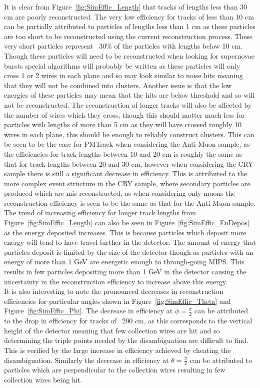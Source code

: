 It is clear from Figure~\ref{fig:SimEffic_Length} that tracks of lengths less than 30 cm are poorly reconstructed. The very low efficiency for tracks of less than 10 cm can be partially attributed to particles of lengths less than 1 cm as these particles are too short to be reconstructed using the current reconstruction process. These very short particles represent ~30\% of the particles with lengths below 10 cm. Though these particles will need to be reconstructed when looking for supernovae bursts special algorithms will probably be written as these particles will only cross 1 or 2 wires in each plane and so may look similar to noise hits meaning that they will not be combined into clusters. Another issue is that the low energies of these particles may mean that the hits are below threshold and so will not be reconstructed. The reconstruction of longer tracks will also be affected by the number of wires which they cross, though this should matter much less for particles with lengths of more than 5 cm as they will have crossed roughly 10 wires in each plane, this should be enough to reliably construct clusters. This can be seen to be the case for PMTrack when considering the Anti-Muon sample, as the efficiencies for track lengths between 10 and 20 cm is roughly the same as that for track lengths between 20 and 30 cm, however when considering the CRY sample there is still a significant decrease in efficiency. This is attributed to the more complex event structure in the CRY sample, where secondary particles are produced which are mis-reconstructed, as when considering only muons the reconstruction efficiency is seen to be the same as that for the Anti-Muon sample. \\

The trend of increasing efficiency for longer track lengths from Figure~\ref{fig:SimEffic_Length} can also be seen in Figure~\ref{fig:SimEffic_EnDepos} as the energy deposited increases. This is because particles which deposit more energy will tend to have travel further in the detector. The amount of energy that particles deposit is limited by the size of the detector though as particles with an energy of more than 1 GeV are energetic enough to through-going MIPS. This results in few particles depositing more than 1 GeV in the detector causing the uncertainty in the reconstruction efficiency to increase above this energy. \\

It is also interesting to note the pronounced decreases in reconstruction efficiencies for particular angles shown in Figure~\ref{fig:SimEffic_Theta} and Figure~\ref{fig:SimEffic_Phi}. The decrease in efficiency at $\phi = \frac{\pi}{2}$ can be attributed to the drop in efficiency for tracks of ~200 cm, as this corresponds to the vertical height of the detector meaning that few collection wires are hit and so determining the triple points needed by the disambiguation are difficult to find. This is verified by the large increase in efficiency achieved by cheating the disambiguation. Similarly the decrease in efficiency at $\theta = \frac{\pi}{2}$ can be attributed to particles which are perpendicular to the collection wires resulting in few collection wires being hit. \\  

